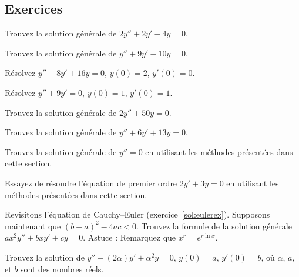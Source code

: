\subsection{Exercices}

\begin{exercise}
Trouvez la solution générale de $2y'' + 2y' -4 y = 0$.
\end{exercise}

\begin{exercise}
Trouvez la solution générale de $y'' + 9y' - 10 y = 0$.
\end{exercise}

\begin{exercise}
Résolvez $y'' - 8y' + 16 y = 0$, $y(0) = 2$, $y'(0) = 0$.
\end{exercise}

\begin{exercise}
Résolvez $y'' + 9y' = 0$, $y(0) = 1$, $y'(0) = 1$.
\end{exercise}

\begin{exercise}
Trouvez la solution générale de $2y'' + 50y = 0$.
\end{exercise}

\begin{exercise}
Trouvez la solution générale de $y'' + 6 y' + 13 y = 0$.
\end{exercise}

\begin{exercise}
Trouvez la solution générale de $y'' = 0$ en utilisant les méthodes présentées dans cette section. 
\end{exercise}

\begin{exercise}
Essayez de résoudre l'équation de premier ordre  
$2y' + 3y = 0$ en utilisant les méthodes présentées dans cette section. 
\end{exercise}

\begin{exercise}
Revisitons l'équation de Cauchy--Euler  (exercice~\ref{sol:eulerex}).  Supposons maintenant que ${(b-a)}^2-4ac < 0$.  Trouvez la formule de la solution générale  $a x^2 y'' + b x y' + c y = 0$.  Astuce : Remarquez que $x^r = e^{r \ln x}$.
\end{exercise}

\begin{exercise}
Trouvez la solution de
$y''-(2\alpha) y' + \alpha^2 y=0$, $y(0) = a$, $y'(0)=b$,
où $\alpha$, $a$, et $b$ sont des nombres réels.
\end{exercise}

